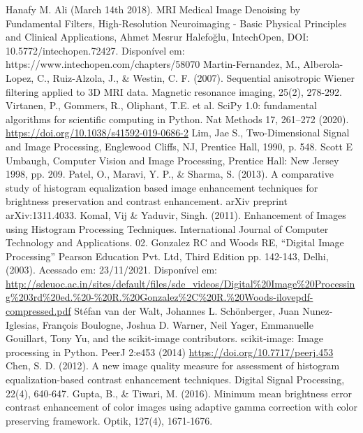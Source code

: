 \documentclass[conference]{IEEEtran}
\begin{document}
\begin{thebibliography}{00}
 Hanafy M. Ali (March 14th 2018). MRI Medical Image Denoising by Fundamental Filters, High-Resolution Neuroimaging - Basic Physical Principles and Clinical Applications, Ahmet Mesrur Halefoğlu, IntechOpen, DOI: 10.5772/intechopen.72427. Disponível em: https://www.intechopen.com/chapters/58070
 Martin-Fernandez, M., Alberola-Lopez, C., Ruiz-Alzola, J., \& Westin, C. F. (2007). Sequential anisotropic Wiener filtering applied to 3D MRI data. Magnetic resonance imaging, 25(2), 278-292.
 Virtanen, P., Gommers, R., Oliphant, T.E. et al. SciPy 1.0: fundamental algorithms for scientific computing in Python. Nat Methods 17, 261–272 (2020). \url{https://doi.org/10.1038/s41592-019-0686-2}
 Lim, Jae S., Two-Dimensional Signal and Image Processing, Englewood Cliffs, NJ, Prentice Hall, 1990, p. 548.
 Scott E Umbaugh, Computer Vision and Image Processing, Prentice Hall: New Jersey 1998, pp. 209.
 Patel, O., Maravi, Y. P., \& Sharma, S. (2013). A comparative study of histogram equalization based image enhancement techniques for brightness preservation and contrast enhancement. arXiv preprint arXiv:1311.4033.
 Komal, Vij \& Yaduvir, Singh. (2011). Enhancement of Images using Histogram Processing Techniques. International Journal of Computer Technology and Applications. 02.
 Gonzalez RC and Woods RE, “Digital Image Processing” Pearson Education Pvt. Ltd, Third
Edition pp. 142-143, Delhi, (2003). Acessado em: 23/11/2021. Disponível em: \url{http://sdeuoc.ac.in/sites/default/files/sde_videos/Digital%20Image%20Processing%203rd%20ed.%20-%20R.%20Gonzalez%2C%20R.%20Woods-ilovepdf-compressed.pdf}
 Stéfan van der Walt, Johannes L. Schönberger, Juan Nunez-Iglesias, François Boulogne, Joshua D. Warner, Neil Yager, Emmanuelle Gouillart, Tony Yu, and the scikit-image contributors. scikit-image: Image processing in Python. PeerJ 2:e453 (2014) \url{https://doi.org/10.7717/peerj.453}
 Chen, S. D. (2012). A new image quality measure for assessment of histogram equalization-based contrast enhancement techniques. Digital Signal Processing, 22(4), 640-647.
 Gupta, B., \& Tiwari, M. (2016). Minimum mean brightness error contrast enhancement of color images using adaptive gamma correction with color preserving framework. Optik, 127(4), 1671-1676.
\end{thebibliography}
\vspace{12pt}
\end{document}
